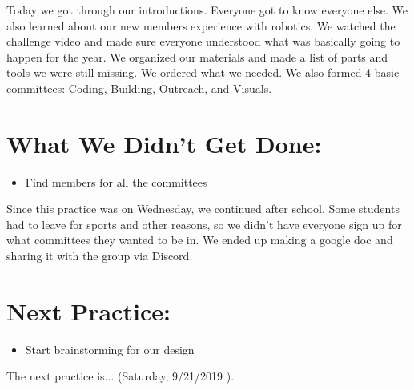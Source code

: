 \documentclass[12pt]{article}
\begin{document}
Today we got through our introductions. Everyone got to know everyone else. We also learned about our new members experience with robotics. We watched the challenge video and made sure everyone understood what was basically going to happen for the year. We organized our materials and made a list of parts and tools we were still missing. We ordered what we needed. We also formed 4 basic committees: Coding, Building, Outreach, and Visuals.

\section{What We Didn't Get Done:} %
\begin{itemize}
	\item Find members for all the committees
\end{itemize}

Since this practice was on Wednesday, we continued after school. Some students had to leave for sports and other reasons, so we didn’t have everyone sign up for what committees they wanted to be in. We ended up making a google doc and sharing it with the group via Discord.

\section{Next Practice:}
\begin{itemize}
	\item Start brainstorming for our design
\end{itemize}

The next practice is... (Saturday, 9/21/2019 ). 
\end{document}
